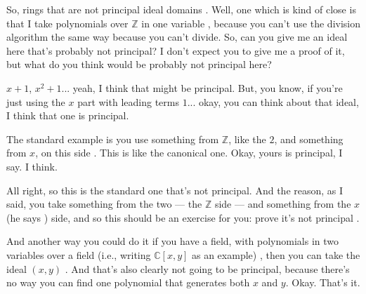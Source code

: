 \begin{speech}[00:40:13 - 00:42:03]
So, rings that are not principal ideal domains . Well, one which is kind of close is that I take polynomials over $\mathbb{Z}$ in one variable , because you can't use the division algorithm the same way because you can't divide. So, can you give me an ideal here that's probably not principal? I don't expect you to give me a proof of it, but what do you think would be probably not principal here? 

$x + 1$, $x^2 + 1$... yeah, I think that might be principal. But, you know, if you're just using the $x$ part with leading terms $1$... okay, you can think about that ideal, I think that one is principal.

The standard example is you use something from $\mathbb{Z}$, like the $2$, and something from $x$, on this side . This is like the canonical one. Okay, yours is principal, I say. I think.

All right, so this is the standard one that's not principal. And the reason, as I said, you take something from the two --- the $\mathbb{Z}$ side --- and something from the $x$ (he says ) side, and so this should be an exercise for you: prove it's not principal .

And another way you could do it if you have a field, with polynomials in two variables over a field (i.e., writing $\mathbb{C}[x, y]$ as an example) , then you can take the ideal $(x, y)$ . And that's also clearly not going to be principal, because there's no way you can find one polynomial that generates both $x$ and $y$. Okay. That's it. 
\end{speech}

